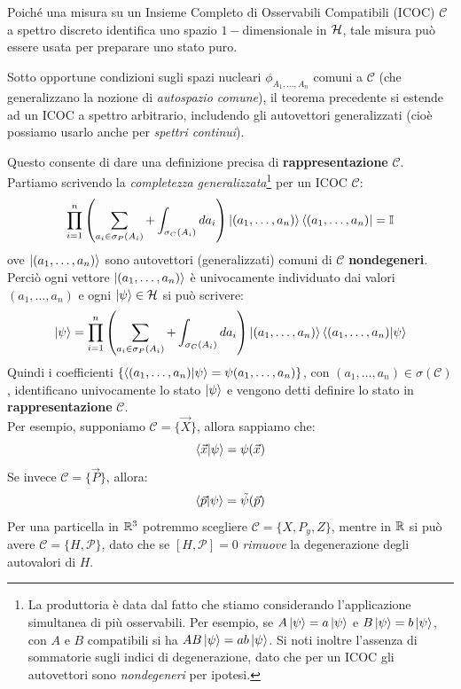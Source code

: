 \documentclass[../../FisicaTeorica.tex]{subfiles}
\begin{document}
\begin{oss}
Poiché una misura su un Insieme Completo di Osservabili Compatibili (ICOC) $\mathcal{C}$ a spettro discreto identifica uno spazio $1-$dimensionale in $\mathcal{H}$, tale misura può essere usata per preparare uno stato puro.
\end{oss}
\begin{oss}
Sotto opportune condizioni sugli spazi nucleari $\phi_{A_1,\dots,A_n}$ comuni a $\mathcal{C}$ (che generalizzano la nozione di \textit{autospazio comune}), il teorema precedente si estende ad un ICOC a spettro arbitrario, includendo gli autovettori generalizzati (cioè possiamo usarlo anche per \textit{spettri continui}).
\end{oss}
Questo consente di dare una definizione precisa di \textbf{rappresentazione} $\mathcal{C}$.\\
Partiamo scrivendo la \textit{completezza generalizzata}\footnote{La produttoria è data dal fatto che stiamo considerando l'applicazione simultanea di più osservabili. Per esempio, se $A\ket{\psi}=a\ket{\psi}$ e $B\ket{\psi}=b\ket{\psi}$, con $A$ e $B$ compatibili si ha $AB\ket{\psi}=ab\ket{\psi}$. Si noti inoltre l'assenza di sommatorie sugli indici di degenerazione, dato che per un ICOC gli autovettori sono \textit{nondegeneri} per ipotesi.} per un ICOC $\mathcal{C}$:
\[
\prod_{i=1}^n \left(\sum_{a_i \in \sigma_P(A_i)} + \int_{\sigma_C(A_i)} da_i\right) \ket{(a_1,\dots,a_n)}\bra{(a_1,\dots,a_n)}=\mathbb{I}
\]
ove $\ket{(a_1, \dots, a_n)}$ sono autovettori (generalizzati) comuni di $\mathcal{C}$ \textbf{nondegeneri}. Perciò ogni vettore $\ket{(a_1, \dots, a_n)}$ è univocamente individuato dai valori $(a_1, \dots, a_n)$ e ogni $\ket{\psi}\in \mathcal{H}$ si può scrivere:
\[
\ket{\psi}=\prod_{i=1}^n \left(\sum_{a_i\in \sigma_P(A_i)} + \int_{\sigma_C(A_i)}da_i \right) \ket{(a_1, \dots, a_n)}\braket{(a_1, \dots, a_n)|\psi}
\]
Quindi i coefficienti $\{\braket{(a_1, \dots, a_n)|\psi}=\psi(a_1, \dots, a_n)\}$, con $(a_1, \dots, a_n)\in \sigma(\mathcal{C})$, identificano univocamente lo stato $\ket{\psi}$ e vengono detti definire lo stato in \textbf{rappresentazione }$\mathcal{C}$.\\
Per esempio, supponiamo $\mathcal{C}=\{\vec{X}\}$, allora sappiamo che:
\[
\braket{\vec{x}|\psi}=\psi(\vec{x})
\]
Se invece $\mathcal{C}=\{\vec{P}\}$, allora:
\[
\braket{\vec{p}|\psi}=\tilde{\psi}(\vec{p})
\]
Per una particella in $\mathbb{R}^3$ potremmo scegliere $\mathcal{C}=\{X,P_y, Z\}$, mentre in $\mathbb{R}$ si può avere $\mathcal{C}=\{H, \mathcal{P}\}$, dato che se $[H,\mathcal{P}]=0$ \textit{rimuove} la degenerazione degli autovalori di $H$.
\end{document}
